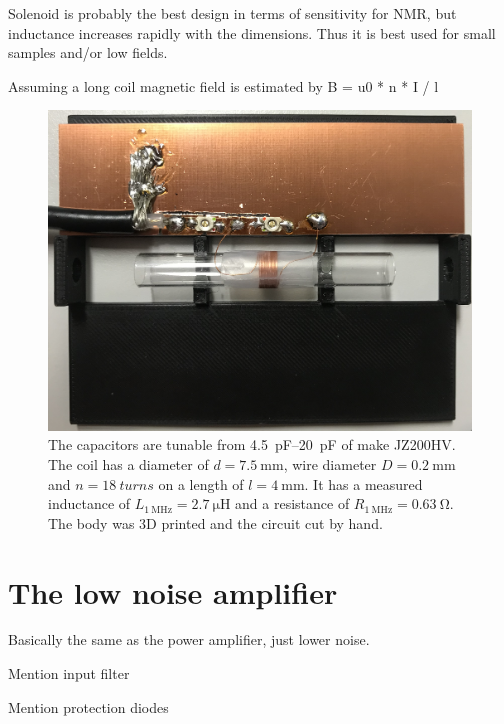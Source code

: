 Solenoid is probably the best design in terms of sensitivity for NMR, but inductance increases rapidly with the dimensions. Thus it is best used for small samples and/or low fields\cite{mispelterNMRProbeheadsBiophysical2015}.

Assuming a long coil magnetic field is estimated by
B = u0 * n * I / l \cite{mispelterNMRProbeheadsBiophysical2015}

\begin{figure}[hbt]
    \centering
    \includegraphics{images/probe.jpg}
    \caption{ The capacitors are tunable from \qtyrange{4.5}{20}{\pico\farad} of make JZ200HV. The coil has a diameter of \(d = \qty{7.5}{\milli\meter}\), wire diameter \(D = \qty{0.2}{\milli\meter}\) and \(n = \qty{18}{turns}\) on a length of \(l = \qty{4}{\milli\meter}\). It has a measured inductance of \(L_{\qty{1}{\mega\hertz}} = \qty{2.7}{\micro\henry}\) and a resistance of \(R_{\qty{1}{\mega\hertz}} = \qty{0.63}{\ohm}\). The body was 3D printed and the circuit cut by hand.}
\end{figure}

\section{The low noise amplifier}

Basically the same as the power amplifier, just lower noise.

Mention input filter

Mention protection diodes

